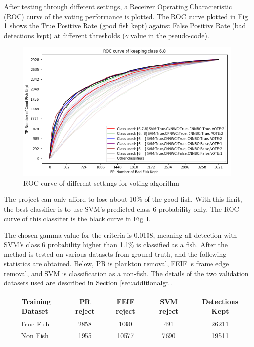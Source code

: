 \documentclass[bsc,logo,twoside,fullspacing,parskip]{infthesis}
\begin{document}
After testing through different settings, a Receiver Operating Characteristic (ROC) curve of the voting performance is plotted.
The ROC curve plotted in Fig \ref{fig:roccurve} shows the True Positive Rate (good fish kept) against False Positive Rate (bad detections kept) at different thresholds ($\gamma$ value in the pseudo-code).

\begin{figure}[ht]
\centering
    \includegraphics[scale=0.6]{graph/roccurve.png}
    \caption{ROC curve of different settings for voting algorithm}
    \label{fig:roccurve}
\end{figure} 

The project can only afford to lose about 10\% of the good fish.
With this limit, the best classifier is to use SVM's predicted class 6 probability only.
The ROC curve of this classifier is the black curve in Fig \ref{fig:roccurve}. 

The chosen gamma value for the criteria is 0.0108, meaning all detection with SVM's class 6 probability higher than 1.1\% is classified as a fish.
After the method is tested on various datasets from ground truth, and the following statistics are obtained. 
Below, PR is plankton removal, FEIF is frame edge removal, and SVM is classification as a non-fish.
The details of the two validation datasets used are described in Section \ref{sec:additionalgt}.

\begin{center}
\footnotesize
\begin{tabular}{|c|c|c|c|c|}
\hline 
$ $ Training Dataset & PR reject & FEIF reject & SVM reject & Detections Kept\\
\hline 
True Fish & 2858 & 1090 & 491 & 26211 \\
Non Fish & 1955 & 10577 & 7690 & 19511 \\
\hline 
\end{tabular}
\end{center}
\end{document}

